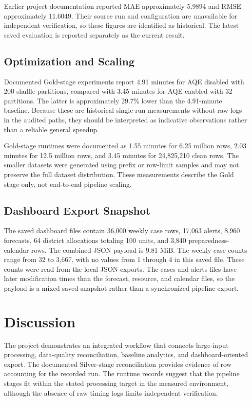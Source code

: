 \documentclass[conference]{IEEEtran}
\begin{document}
Earlier project documentation reported MAE approximately 5.9894 and RMSE approximately 11.6049. Their source run and configuration are unavailable for independent verification, so these figures are identified as historical. The latest saved evaluation is reported separately as the current result.

\subsection{Optimization and Scaling}

Documented Gold-stage experiments report 4.91 minutes for AQE disabled with 200 shuffle partitions, compared with 3.45 minutes for AQE enabled with 32 partitions. The latter is approximately 29.7\% lower than the 4.91-minute baseline. Because these are historical single-run measurements without raw logs in the audited paths, they should be interpreted as indicative observations rather than a reliable general speedup.

Gold-stage runtimes were documented as 1.55 minutes for 6.25 million rows, 2.03 minutes for 12.5 million rows, and 3.45 minutes for 24,825,210 clean rows. The smaller datasets were generated using prefix or row-limit samples and may not preserve the full dataset distribution. These measurements describe the Gold stage only, not end-to-end pipeline scaling.

\subsection{Dashboard Export Snapshot}

The saved dashboard files contain 36,000 weekly case rows, 17,063 alerts, 8,960 forecasts, 64 district allocations totaling 100 units, and 3,840 preparedness-calendar rows. The combined JSON payload is 9.81 MiB. The weekly case counts range from 32 to 3,667, with no values from 1 through 4 in this saved file. These counts were read from the local JSON exports. The cases and alerts files have later modification times than the forecast, resource, and calendar files, so the payload is a mixed saved snapshot rather than a synchronized pipeline export.

\section{Discussion}

The project demonstrates an integrated workflow that connects large-input processing, data-quality reconciliation, baseline analytics, and dashboard-oriented export. The documented Silver-stage reconciliation provides evidence of row accounting for the recorded run. The runtime records suggest that the pipeline stages fit within the stated processing target in the measured environment, although the absence of raw timing logs limits independent verification.
\end{document}

